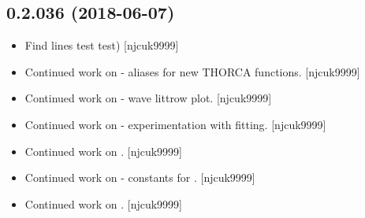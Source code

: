 \documentclass[a4paper,10pt,english]{report}
\begin{document}
\subsection{0.2.036 (2018-06-07)}
\label{\detokenize{misc/changelog:id426}}\begin{itemize}
\item {} 
Find lines test  test) {[}njcuk9999{]}

\item {} 
Continued work on  - aliases for new THORCA functions.
{[}njcuk9999{]}

\item {} 
Continued work on  - wave littrow plot. {[}njcuk9999{]}

\item {} 
Continued work on  - experimentation with fitting. {[}njcuk9999{]}

\item {} 
Continued work on . {[}njcuk9999{]}

\item {} 
Continued work on  - constants for . {[}njcuk9999{]}

\item {} 
Continued work on . {[}njcuk9999{]}

\end{itemize}
\end{document}

